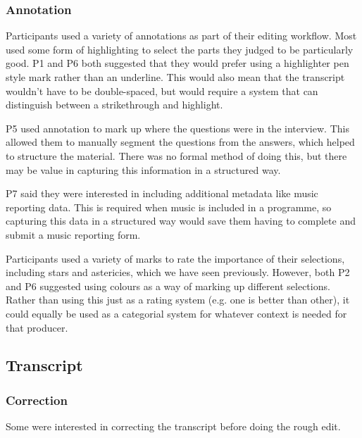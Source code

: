 \subsubsection{Annotation}


Participants used a variety of annotations as part of their editing workflow. Most used some form of highlighting to
select the parts they judged to be particularly good. P1 and P6 both suggested that they would prefer using a
highlighter pen style mark rather than an underline. This would also mean that the transcript wouldn't have to be
double-spaced, but would require a system that can distinguish between a strikethrough and highlight.


P5 used annotation to mark up where the questions were in the interview. This allowed them to manually segment the
questions from the answers, which helped to structure the material. There was no formal method of doing this, but there
may be value in capturing this information in a structured way.

P7 said they were interested in including additional metadata like music reporting data. This is required when music is
included in a programme, so capturing this data in a structured way would save them having to complete and submit a
music reporting form.


Participants used a variety of marks to rate the importance of their selections, including stars and astericies, which
we have seen previously. However, both P2 and P6 suggested using colours as a way of marking up different selections.
Rather than using this just as a rating system (e.g. one is better than other), it could equally be used as a
categorial system for whatever context is needed for that producer.

\subsection{Transcript}

\subsubsection{Correction}


Some were interested in correcting the transcript before doing the rough edit.

